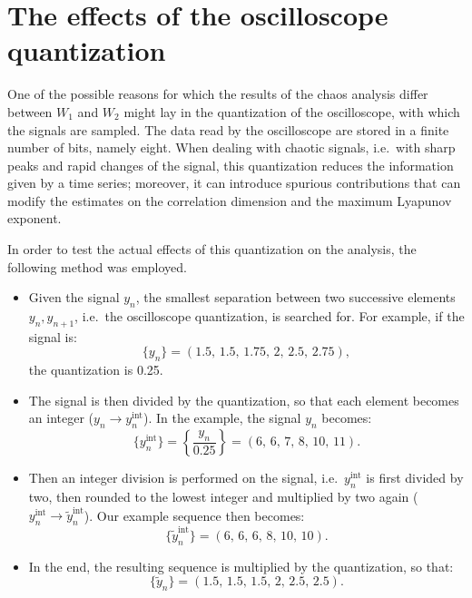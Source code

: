 \section{The effects of the oscilloscope quantization}\label{sec: oscilloscope quantization}

One of the possible reasons for which the results of the chaos analysis differ between $W_1$ and $W_2$
might lay in the quantization of the oscilloscope, with which the signals are sampled.
The data read by the oscilloscope are stored in a finite number of bits, namely eight.
When dealing with chaotic signals, i.e.\ with sharp peaks and rapid changes of the signal,
this quantization reduces the information given by a time series; moreover, it can introduce
spurious contributions that can modify the estimates on the correlation dimension and the maximum
Lyapunov exponent.

In order to test the actual effects of this quantization on the analysis, the following method was
employed.
\begin{itemize}
    \item
    Given the signal $y_n$, the smallest separation between two successive elements
    $y_n,y_{n+1}$, i.e.\ the oscilloscope quantization, is searched for.
    For example, if the signal is:
    \begin{equation*}
        \{y_n\}=(1.5,\,1.5,\,1.75,\,2,\,2.5,\,2.75),
    \end{equation*}
    the quantization is 0.25.

    \item
    The signal is then divided by the quantization, so that each element becomes an integer
    ($y_n\rightarrow y_n^{\text{int}}$).
    In the example, the signal $y_n$ becomes:
    \begin{equation*}
        \{y_n^{\text{int}}\}=\left\{\frac{y_n}{0.25}\right\}=(6,\,6,\,7,\,8,\,10,\,11).
    \end{equation*}

    \item
    Then an integer division is performed on the signal, i.e.\ $y_n^{\text{int}}$ is first divided
    by two, then rounded to the lowest integer and multiplied by two again
    ($y_n^{\text{int}}\rightarrow \tilde{y}_n^{\text{int}}$).
    Our example sequence then becomes:
    \begin{equation*}
        \{\tilde{y}_n^{\text{int}}\}=(6,\,6,\,6,\,8,\,10,\,10).
    \end{equation*}

    \item
    In the end, the resulting sequence is multiplied by the quantization, so that:
    \begin{equation*}
        \{\tilde{y}_n\}=(1.5,\,1.5,\,1.5,\,2,\,2.5,\,2.5).
    \end{equation*}
\end{itemize}

